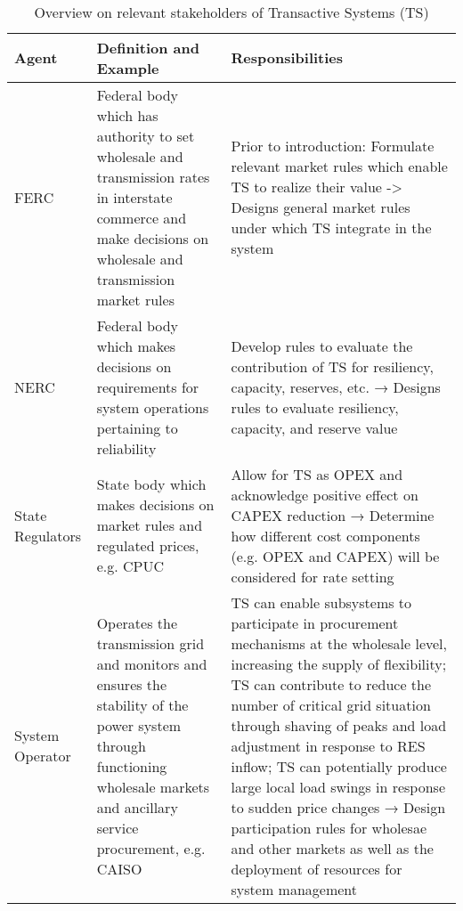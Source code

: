 \begin{table}[!t]
    \caption{Overview on relevant stakeholders of Transactive Systems (TS)}
    \label{tab:stakeholders}
    \centering
    ~\\
    \begin{tabular}{p{}p{}p{}}
        \hline
        Agent & Definition and Example & Responsibilities
    \\  \hline
        FERC &
Federal body which has authority to set wholesale and transmission rates in interstate commerce and make decisions on wholesale and transmission market rules  &
Prior to introduction: Formulate relevant market rules which enable TS to realize their value
->
Designs general market rules under which TS integrate in the system
\\  \hline
NERC &
Federal body which makes decisions on requirements for system operations pertaining to reliability &
Develop rules to evaluate the contribution of TS for resiliency, capacity, reserves, etc.
→
Designs rules to evaluate resiliency, capacity, and reserve value
\\  \hline
State Regulators &
State body which makes decisions on market rules and regulated prices, e.g. CPUC &
Allow for TS as OPEX and acknowledge positive effect on CAPEX reduction
→
Determine how different cost components (e.g. OPEX and CAPEX) will be considered for rate setting
\\  \hline
System Operator &
Operates the transmission grid and monitors and ensures the stability of the power system through functioning wholesale markets and ancillary service procurement, e.g. CAISO &
TS can enable subsystems to participate in procurement mechanisms at the wholesale level, increasing the supply of flexibility; 
TS can contribute to reduce the number of critical grid situation through shaving of peaks and load adjustment in response to RES inflow; TS can potentially produce large local load swings in response to sudden price changes
→
Design participation rules for wholesae and other markets as well as the deployment of resources for system management
\\  \hline
    \end{tabular}
\end{table}





